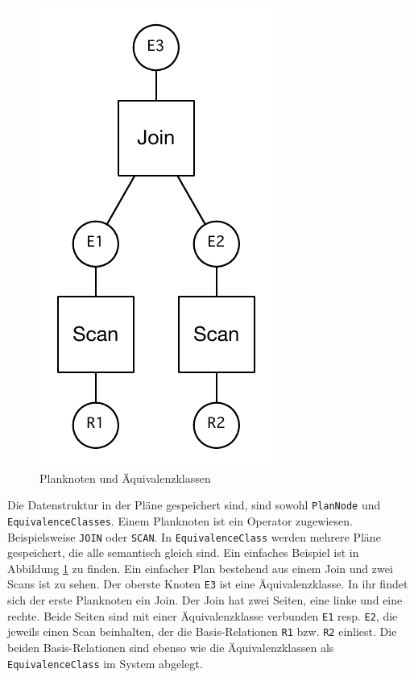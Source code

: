 \begin{figure}[ht]
  \centering
  \includegraphics{04_Implementierung/00_media/JoinScan.pdf}
  \caption{Planknoten und Äquivalenzklassen}
  \label{PlanAequi}
\end{figure}

Die Datenstruktur in der Pläne gespeichert sind, sind sowohl \texttt{Plan\-Node} und \texttt{Equi\-valence\-Classes}. Einem Planknoten ist ein Operator zugewiesen. Beispielsweise \texttt{JOIN} oder \texttt{SCAN}. In \texttt{Equi\-valence\-Class} werden mehrere Pläne gespeichert, die alle semantisch gleich sind. Ein einfaches Beispiel ist in Abbildung \ref{PlanAequi} zu finden. Ein einfacher Plan bestehend aus einem Join und zwei Scans ist zu sehen. Der oberste Knoten \texttt{E3} ist eine Äquivalenzklasse. In ihr findet sich der erste Planknoten ein Join. Der Join hat zwei Seiten, eine linke und eine rechte. Beide Seiten sind mit einer Äquivalenzklasse verbunden \texttt{E1} resp. \texttt{E2}, die jeweils einen Scan beinhalten, der die Basis-Relationen \texttt{R1} bzw. \texttt{R2} einliest. Die beiden Basis-Relationen sind ebenso wie die Äquivalenzklassen als \texttt{Equi\-valence\-Class} im System abgelegt.




